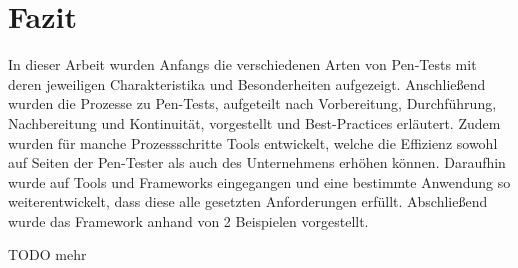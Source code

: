 \chapter{Fazit}
In dieser Arbeit wurden Anfangs die verschiedenen Arten von Pen-Tests mit deren jeweiligen Charakteristika und Besonderheiten aufgezeigt. Anschließend wurden die Prozesse zu Pen-Tests, aufgeteilt nach Vorbereitung, Durchführung, Nachbereitung und Kontinuität, vorgestellt und Best-Practices erläutert. Zudem wurden für manche Prozessschritte Tools entwickelt, welche die Effizienz sowohl auf Seiten der Pen-Tester als auch des Unternehmens erhöhen können. Daraufhin wurde auf Tools und Frameworks eingegangen und eine bestimmte Anwendung so weiterentwickelt, dass diese alle gesetzten Anforderungen erfüllt. Abschließend wurde das Framework anhand von 2 Beispielen vorgestellt.

TODO mehr